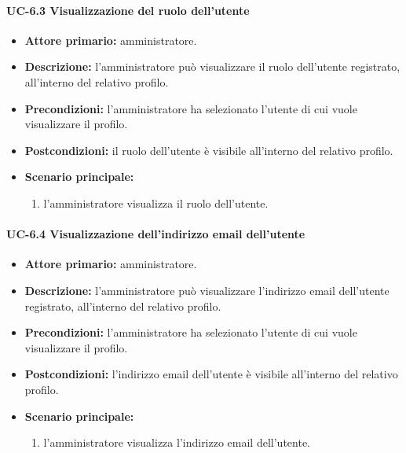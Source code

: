     \paragraph{UC-6.3 Visualizzazione del ruolo dell'utente}
    \begin{itemize}
        \item \textbf{Attore primario:} amministratore.
        
        \item \textbf{Descrizione:} l'amministratore può visualizzare il ruolo dell'utente registrato, all'interno del relativo profilo.
        
        \item \textbf{Precondizioni:} l'amministratore ha selezionato l'utente di cui vuole visualizzare il profilo.
    
        \item \textbf{Postcondizioni:} il ruolo dell'utente è visibile all'interno del relativo profilo.
    
        \item \textbf{Scenario principale:}
        \begin{enumerate}
            \item  l'amministratore visualizza il ruolo dell'utente.
        \end{enumerate}
    \end{itemize}

    \paragraph{UC-6.4 Visualizzazione dell'indirizzo email dell'utente}
    \begin{itemize}
        \item \textbf{Attore primario:} amministratore.
        
        \item \textbf{Descrizione:} l'amministratore può visualizzare l'indirizzo email dell'utente registrato, all'interno del relativo profilo.
        
        \item \textbf{Precondizioni:} l'amministratore ha selezionato l'utente di cui vuole visualizzare il profilo.
    
        \item \textbf{Postcondizioni:} l'indirizzo email dell'utente è visibile all'interno del relativo profilo.
    
        \item \textbf{Scenario principale:}
        \begin{enumerate}
            \item  l'amministratore visualizza l'indirizzo email dell'utente.
        \end{enumerate}
    \end{itemize}
    
